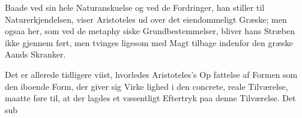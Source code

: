 \documentclass[12pt,a4paper]{book}
\begin{document}
Baade ved sin hele Naturanskuelse og ved de Fordringer,
han stiller til Naturerkjendelsen, viser Aristoteles ud over det
eiendommeligt Græske; men ogsaa her, som ved de metaphy\-%
siske Grundbestemmelser, bliver hans Stræben ikke gjennem\-%
ført, men tvinges ligesom med Magt tilbage indenfor den
græske Aands Skranker.

Det er allerede tidligere viist, hvorledes Aristoteles's Op\-%
fattelse af Formen som den iboende Form, der giver sig Virke\-%
lighed i den concrete, reale Tilværelse, maatte føre til, at der
lagdes et væsentligt Eftertryk paa denne Tilværelse. Det sub\-%
%
%
%
%
\end{document}

